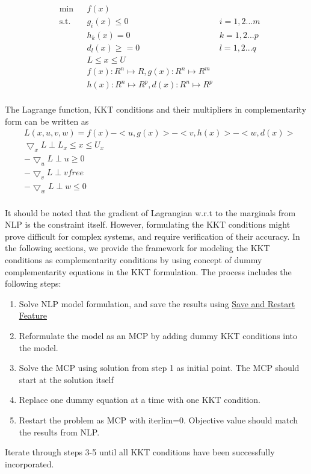 \documentclass{article}
\begin{document}
\begin{equation}
\begin{aligned}
&	\min
& & f(x) \\
& \text{s.t.} & & 	 g_{i}(x) \leqslant 0	&	i = 1,2...m \\
& & &			h_{k}(x) = 0	 &	k = 1,2...p \\
& & &			d_{l}(x) \geqslant =0		&	l = 1,2...q \\
& & &			L \leq x \leq U \\
& & &			f(x): {\!R}^n \mapsto \!R , g(x): {\!R}^n \mapsto {\!R}^m\\
& & &			h(x): {\!R}^n \mapsto {\!R}^ p , d(x): {\!R}^n \mapsto {\!R}^ p\\
\end{aligned}
\end{equation}

\noindent The Lagrange function, KKT conditions and their multipliers in complementarity form can be written as \\

\begin{equation}
\begin{aligned}
& L(x,u,v,w) = f(x) - <u,g(x)> - <v,h(x)> - <w,d(x)>  \\
& \bigtriangledown_x L  \perp L_x \leq x \leq U_x 	\\
& - \bigtriangledown_u L  \perp u \geq 0	\\
& -\bigtriangledown_v L  \perp v free	\\
& -\bigtriangledown_w L  \perp w \leq 0	\\
\end{aligned}
\end{equation}

\noindent It should be noted that the gradient of Lagrangian w.r.t to the marginals from NLP is the constraint itself. However, formulating the KKT conditions
might prove difficult for complex systems, and require verification of their accuracy. In the following sections, we provide the framework for modeling the
KKT conditions as complementarity conditions by using concept of dummy complementarity equations in the KKT formulation.
The process includes the following steps:

\begin{enumerate}
	\item Solve NLP model formulation, and save the results using \href{https://www.gams.com/latest/docs/UG_SaveRestart.html}{Save and Restart Feature}
	\item	Reformulate the model as an MCP by adding dummy KKT conditions into the model.
  \item Solve the MCP using solution from step 1 as initial point. The MCP should start at the solution itself
	\item Replace one dummy equation at a time with one KKT condition.
	\item Restart the problem as MCP with iterlim=0. Objective value should match the results from NLP.
\end{enumerate}
\noindent Iterate through steps 3-5 until all KKT conditions have been successfully incorporated.
\end{document}
